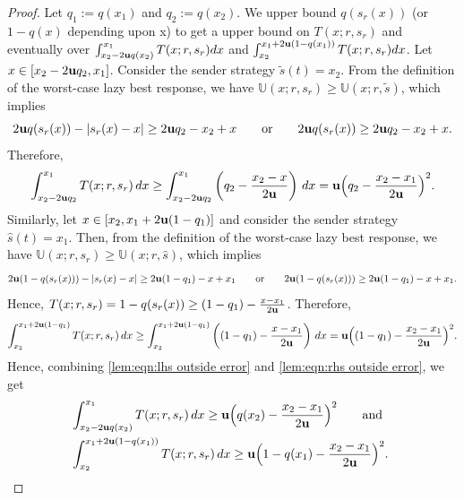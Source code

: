 \begin{proof}\label{proof:more sharp estimate of the error outside the delta}
     Let $q_1 := q(x_1)$ and $q_2 := q(x_2)$. We upper bound $q(s_r(x))$ (or $1-q(x)$ depending upon x) to get a upper bound on $T(x;r,s_r)$ and eventually over $\int_{x_2 - 2\mathbf{u} q(x_2)}^{x_1} T(x;r,s_r)dx$ and $\int_{x_2}^{x_1 + 2\mathbf{u}(1-q(x_1))}T(x;r,s_r)dx$.
    Let $x \in [x_2 - 2\mathbf{u} q_2, x_1]$. Consider the sender strategy $\tilde{s}(t) = x_2$. From the definition of the worst-case lazy best response, we have $\mathbb{U}(x; r, s_r) \geq \mathbb{U}(x; r, \tilde{s})$, which implies
    \[
    2\mathbf{u} q(s_r(x)) - |s_r(x) - x| \geq 2\mathbf{u} q_2 - x_2 + x \quad \hbox{\quad or\quad} \quad 2\mathbf{u} q(s_r(x)) \geq 2\mathbf{u} q_2 - x_2 + x.
    \] Therefore,
    \begin{equation}\label{lem:eqn:lhs outside error}
        \int_{x_2 - 2\mathbf{u} q_2}^{x_1} T(x; r, s_r) \, dx \geq \int_{x_2 - 2\mathbf{u} q_2}^{x_1} \left( q_2 - \frac{x_2 - x}{2\mathbf{u}} \right) \, dx = \mathbf{u} \Big( q_2 - \frac{x_2 - x_1}{2\mathbf{u}} \Big)^2.
    \end{equation}
    Similarly, let $x \in [x_2, x_1 + 2\mathbf{u}(1 - q_1)]$ and consider the sender strategy $\hat{s}(t) = x_1$. Then, from the definition of the worst-case lazy best response, we have $\mathbb{U}(x; r, s_r) \geq \mathbb{U}(x; r, \hat{s})$, which implies
    \[
    2\mathbf{u}(1 - q(s_r(x))) - |s_r(x) - x| \geq 2\mathbf{u}(1 - q_1) - x + x_1 \quad \hbox{\quad or\quad} \quad 2\mathbf{u}(1 - q(s_r(x))) \geq 2\mathbf{u}(1 - q_1) - x + x_1.
    \]
    Hence, $T(x; r, s_r) = 1 - q(s_r(x)) \geq (1 - q_1) - \frac{x - x_1}{2\mathbf{u}}$. Therefore,
    \begin{equation}\label{lem:eqn:rhs outside error}
        \int_{x_2}^{x_1 + 2\mathbf{u}(1 - q_1)} T(x; r, s_r) \, dx \geq \int_{x_2}^{x_1 + 2\mathbf{u}(1 - q_1)} \left( (1 - q_1) - \frac{x - x_1}{2\mathbf{u}} \right) \, dx = \mathbf{u} \Big( (1 - q_1) - \frac{x_2 - x_1}{2\mathbf{u}} \Big)^2.
    \end{equation}
    Hence, combining \eqref{lem:eqn:lhs outside error} and \eqref{lem:eqn:rhs outside error}, we get
    \begin{equation*}
    \begin{aligned}
        &\int_{x_2 - 2\mathbf{u} q(x_2)}^{x_1} T(x; r, s_r) \, dx \geq \mathbf{u} \Big( q(x_2) - \frac{x_2 - x_1}{2\mathbf{u}} \Big)^2 \quad \hbox{\quad and\quad} \\
        &\int_{x_2}^{x_1 + 2\mathbf{u}(1 - q(x_1))} T(x; r, s_r) \, dx \geq \mathbf{u} \Big( 1 - q(x_1) - \frac{x_2 - x_1}{2\mathbf{u}} \Big)^2.
    \end{aligned}
    \end{equation*}
\end{proof}


